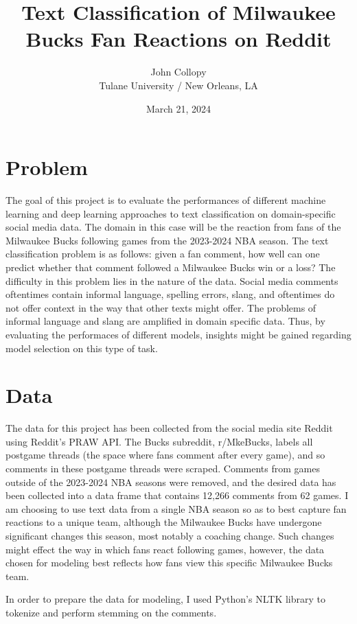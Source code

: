 \documentclass[11pt,a4paper]{article}
\title{Text Classification of Milwaukee Bucks Fan Reactions on Reddit}
\author{John Collopy \\
  Tulane University / New Orleans, LA \\}
\date{March 21, 2024}
\begin{document}
\maketitle

\section{Problem}

The goal of this project is to evaluate the performances of different machine learning and deep learning approaches to text classification on domain-specific social media data. The domain in this case will be the reaction from fans of the Milwaukee Bucks following games from the 2023-2024 NBA season. The text classification problem is as follows: given a fan comment, how well can one predict whether that comment followed a Milwaukee Bucks win or a loss? The difficulty in this problem lies in the nature of the data. Social media comments oftentimes contain informal language, spelling errors, slang, and oftentimes do not offer context in the way that other texts might offer. The problems of informal language and slang are amplified in domain specific data. Thus, by evaluating the performaces of different models, insights might be gained regarding model selection on this type of task.

\section{Data}

The data for this project has been collected from the social media site Reddit using Reddit's PRAW API. The Bucks subreddit, r/MkeBucks, labels all postgame threads (the space where fans comment after every game), and so comments in these postgame threads were scraped. Comments from games outside of the 2023-2024 NBA seasons were removed, and the desired data has been collected into a data frame that contains 12,266 comments from 62 games. I am choosing to use text data from a single NBA season so as to best capture fan reactions to a unique team, although the Milwaukee Bucks have undergone significant changes this season, most notably a coaching change. Such changes might effect the way in which fans react following games, however, the data chosen for modeling best reflects how fans view this specific Milwaukee Bucks team.


In order to prepare the data for modeling, I used Python's NLTK library to tokenize and perform stemming on the comments.
\end{document}
